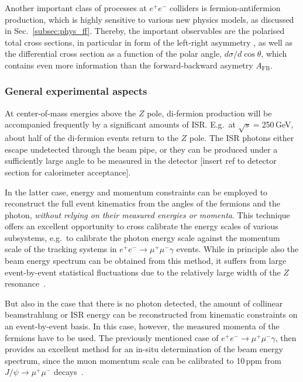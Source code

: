 Another important class of processes at $e^+e^-$ colliders is fermion-antifermion production, which is highly sensitive to various new physics models, as discussed in Sec.~\ref{subsec:phys_ff}. Thereby, the important observables are the polarised total cross sections, in particular in form of the left-right asymmetry \ALR, as well as the differential cross section as a function of the polar angle, $d\sigma/d \cos{\theta}$, which contains even more information than the forward-backward asymetry $A_{\mathrm{FB}}$.

\subsubsection{General experimental aspects}

At center-of-mass energies above the $Z$ pole, di-fermion production will be accompanied frequently by a significant amounts of ISR. E.g.\ at $\sqrt{s}=$250\,GeV, about half of the di-fermion events return to the $Z$ pole. The ISR photons either escape undetected through the beam pipe, or they can be produced under a sufficiently large angle to be measured in the detector {\color{red} [insert ref to detector section for calorimeter acceptance]}.

In the latter case, energy and momentum constraints can be employed to reconstruct the full event kinematics from the angles of the fermions and the photon, {\em without relying on their measured energies or momenta}. This technique offers an excellent opportunity to cross calibrate the energy scales of various subsystems, e.g.\ to calibrate the photon energy scale against the momentum scale of the tracking systems in $e^+e^- \to \mu^+\mu^-\gamma $ events. While in principle also the beam energy spectrum can be obtained from this method, it suffers from large event-by-event statistical fluctuations due to the relatively large width of the $Z$ resonance~\cite{Wilson:2016hne}.

But also in the case that there is no photon detected, the amount of collinear beamstrahlung or ISR energy can be reconstructed from kinematic constraints on an event-by-event basis. In this case, however, the measured momenta of the fermions have to be used. The previously mentioned case of $e^+e^- \to \mu^+\mu^-\gamma $, then provides an excellent method for an in-situ determination of the beam energy spectrum, since the muon momentum scale can be calibrated to 10\,ppm from $J/\psi \to \mu^+\mu^-$ decays~\cite{Wilson:2016hne}.

